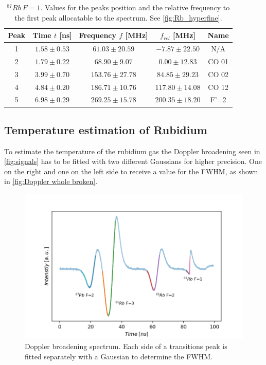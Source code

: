 \documentclass[]{article}
\begin{document}
\begin{table}[H]
\centering
\begin{tabular}{|c|c|c|||c|c|}
\hline
Peak & Time $t$ [ns] & Frequency $f$ [MHz] & $f_{rel}$ [MHz] & Name \\ \hline\hline
1 & $1.58 \pm 0.53$  & $61.03 \pm 20.59$  & $-7.87 \pm 22.50$  & N/A \\ \hline
2 & $1.79 \pm 0.22$  & $68.90 \pm 9.07$  & $0.00 \pm 12.83$  & CO 01 \\ \hline
3 & $3.99 \pm 0.70$  & $153.76 \pm 27.78$  & $84.85 \pm 29.23$  & CO 02 \\ \hline
4 & $4.84 \pm 0.20$  & $186.71 \pm 10.76$  & $117.80 \pm 14.08$  & CO 12 \\ \hline
5 & $6.98 \pm 0.29$  & $269.25 \pm 15.78$  & $200.35 \pm 18.20$  & F'=2 \\ \hline
\hline
\end{tabular}
\caption{$^{87}Rb\ F=1 $. Values for the peaks position and the relative frequency to the first peak allocatable to the spectrum. See \autoref{fig:Rb_hyperfine}.}
\end{table}


\newpage
\subsection{Temperature estimation of Rubidium}
To estimate the temperature of the rubidium gas the Doppler broadening seen in \autoref{fig:signals} has to be fitted with two different Gaussians for higher precision. One on the right and one on the left side to receive a value for the FWHM, as shown in \autoref{fig:Doppler whole broken}.

\begin{figure}[H]
\centering
\includegraphics[width=.9\textwidth]{Plots/Doppler_whole.png}
\caption{Doppler broadening spectrum. Each side of a transitions peak is fitted separately with a Gaussian to determine the FWHM.}
\label{fig:Doppler whole broken}
\end{figure}
\end{document}
